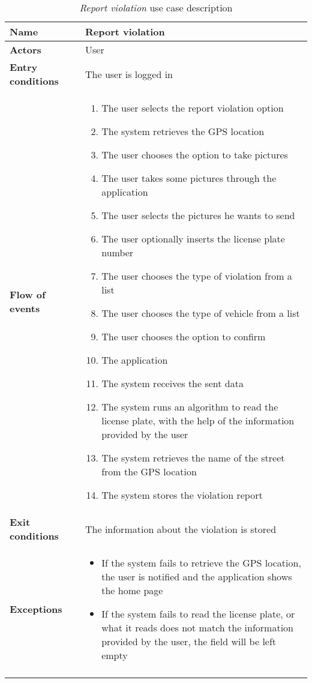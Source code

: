 		\begin{longtable}{p{0.25\linewidth}p{0.75\linewidth}}
			\toprule
			\textbf{Name} & \textbf{Report violation} \\
			\midrule
			\textbf{Actors} & User \\
			\midrule
			\textbf{Entry conditions} & The user is logged in \\
			\midrule
			\textbf{Flow of events} & 
			\begin{enumerate}
				\item The user selects the report violation option
				\item The system retrieves the GPS location
				\item The user chooses the option to take pictures
				\item The user takes some pictures through the application
				\item The user selects the pictures he wants to send
				\item The user optionally inserts the license plate number
				\item The user chooses the type of violation from a list
				\item The user chooses the type of vehicle from a list
				\item The user chooses the option to confirm
				\item The application 
				\item The system receives the sent data
				\item The system runs an algorithm to read the license plate, with the help of the information provided by the user
				\item The system retrieves the name of the street from the GPS location
				\item The system stores the violation report
			\end{enumerate} \\
			\midrule
			\textbf{Exit conditions} & The information about the violation is stored\\
			\midrule
			\textbf{Exceptions} & 
			\begin{itemize}
				\item If the system fails to retrieve the GPS location, the user is notified and the application shows the home page
				\item If the system fails to read the license plate, or what it reads does not match the information provided by the user, the field will be left empty
			\end{itemize} \\
			\bottomrule
			\caption{\emph{Report violation} use case description}
		\end{longtable}

